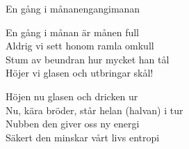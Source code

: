 \begin{song}{En gång i månan}{engangimanan}
\begin{vers}
En gång i månan är månen full\\
Aldrig vi sett honom ramla omkull\\
Stum av beundran hur mycket han tål\\
Höjer vi glasen och utbringar skål!\\
\end{vers}
\begin{vers}
Höjen nu glasen och dricken ur\\
Nu, kära bröder, står helan (halvan) i tur\\
Nubben den giver oss ny energi\\
Säkert den minskar vårt livs entropi\\
\end{vers}
\end{song}
